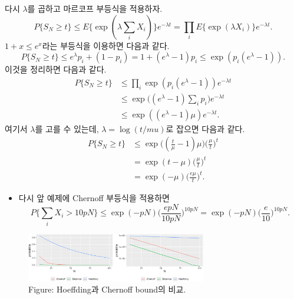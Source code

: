 \documentclass[
  13pt,
  letterpaper,
  DIV=11,
  numbers=noendperiod]{scrreprt}
\providecommand{\tightlist}{%
  \setlength{\itemsep}{0pt}\setlength{\parskip}{0pt}}\usepackage{longtable,booktabs,array}
\theoremstyle{definition}
\theoremstyle{plain}
\theoremstyle{definition}
\theoremstyle{plain}
\theoremstyle{plain}
\theoremstyle{definition}
\theoremstyle{remark}
\begin{document}
\begin{tcolorbox}[enhanced jigsaw, colframe=quarto-callout-note-color-frame, bottomtitle=1mm, opacitybacktitle=0.6, breakable, leftrule=.75mm, title=\textcolor{quarto-callout-note-color}{\faInfo}\hspace{0.5em}{Proof}, colback=white, toprule=.15mm, toptitle=1mm, opacityback=0, arc=.35mm, rightrule=.15mm, bottomrule=.15mm, left=2mm, titlerule=0mm, coltitle=black, colbacktitle=quarto-callout-note-color!10!white]

다시 \(\lambda\)를 곱하고 마르코프 부등식을 적용하자. \[
P\{ S_N \geq t \} \leq E\{ \exp (\lambda \sum_{i} X_i) \}e^{-\lambda t} = \prod_i E\{ \exp (\lambda X_i) \}e^{-\lambda t}.
\] \(1+x \leq e^{x}\)라는 부등식을 이용하면 다음과 같다. \[
P\{ S_N \geq t \} \leq  e^{\lambda}p_i + (1-p_i) = 1 + (e^{\lambda} - 1)p_i \leq \exp (p_i (e^\lambda - 1)).
\] 이것을 정리하면 다음과 같다. \[
\begin{align*}
P\{ S_N \geq t \} &\leq \prod_i \exp (p_i (e^\lambda -1))e^{-\lambda t}\\
&\leq \exp \Big( (e^\lambda - 1)\sum_i p_i \Big) e^{-\lambda t}\\
&\leq \exp ((e^{\lambda}-1)\mu) e^{-\lambda t}.
\end{align*}
\] 여기서 \(\lambda\)를 고를 수 있는데, \(\lambda = \log (t/mu)\)로
잡으면 다음과 같다. \[
\begin{align*}
P\{ S_N \geq t \} &\leq \exp \Big( (\frac{t}{\mu}-1)\mu \Big) \Big( \frac{\mu}{t} \Big)^t\\
&= \exp (t-\mu) \Big( \frac{\mu}{t} \Big)^t\\
&=\exp (-\mu) \Big( \frac{e\mu}{t} \Big)^t.
\end{align*}
\]

\end{tcolorbox}

\begin{itemize}
\tightlist
\item
  다시 앞 예제에 Chernoff 부등식을 적용하면 \[
  P \{\sum_i X_i > 10pN \} \leq \exp (-p N) \Big( \frac{epN}{10pN}\Big)^{10pN} = \exp (-p N) \Big( \frac{e}{10}\Big)^{10pN}.
  \]
\end{itemize}

\begin{figure}[th]

{\centering \includegraphics[width=0.7\textwidth,height=\textheight]{ineq_files/figure-pdf/unnamed-chunk-5-1.pdf}

}

\caption{Figure: Hoeffding과 Chernoff bound의 비교.}

\end{figure}%
\end{document}
